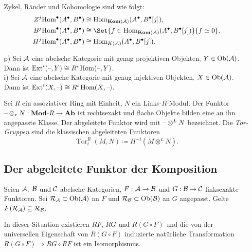 \documentclass{cheat-sheet}
\newcommand{\CCC}[1]{{#1}^{\bullet}} %
\DeclareMathOperator{\Tor}{Tor} %
\DeclareMathOperator{\Ext}{Ext} %
\newcommand{\Ada}{\mathcal{R}} %
\begin{document}
\begin{bem}
  Zykel, Ränder und Kohomologie sind wie folgt:
  \begin{align*}
    Z^j \CCC{\Hom}(\CCC{A}, \CCC{B}) & \cong \Hom_{\Kom(\Aat)}(\CCC{A}, \CCC{B}[j]), \\
    B^j \CCC{\Hom}(\CCC{A}, \CCC{B}) & \cong \Set{f \in \Hom_{\Kom(\Aat)}(\CCC{A}, \CCC{B}[j])}{f \simeq 0}, \\
    H^j \CCC{\Hom}(\CCC{A}, \CCC{B}) & \cong \Hom_{K(\Aat)}(\CCC{A}, \CCC{B}[j]).
  \end{align*}
\end{bem}

\begin{bem}
  p) \enspace Sei $\mathcal{A}$ eine abelsche Kategorie mit genug projektiven Objekten, $Y \in \operatorname{Ob}(\mathcal{A})$.
  Dann ist $\Ext^i(\blank, Y) \cong R^i \Hom(\blank, Y)$. \\
  i) \enspace Sei $\mathcal{A}$ eine abelsche Kategorie mit genug injektiven Objekten, $X \in \operatorname{Ob}(\mathcal{A})$.
  Dann ist $\Ext^i(X, \blank) \cong R^i \Hom(X, \blank)$.
\end{bem}

\begin{defn}
  Sei $R$ ein assoziativer Ring mit Einheit, $N$ ein Links-$R$-Modul.
  Der Funktor $\text{--} \otimes_r N : \text{$\mathbf{Mod}$-$R$} \to \mathbf{Ab}$ ist rechtsexakt und flache Objekte bilden eine an ihn angepasste Klasse.
  Der abgeleitete Funktor wird mit $\text{--} \otimes^L N$ bezeichnet.
  Die \emph{Tor-Gruppen} sind die klassischen abgeleiteten Funktoren
  \[ \Tor_i^R(M, N) \coloneqq H^{-i}(M \otimes^L N). \]
\end{defn}

\subsection{Der abgeleitete Funktor der Komposition}

\begin{situation}
  Seien $\mathcal{A}$, $\mathcal{B}$ und $\mathcal{C}$ abelsche Kategorien, $F : \mathcal{A} \to \mathcal{B}$ und $G : \mathcal{B} \to \mathcal{C}$ linksexakte Funktoren.
  Sei $\Ada_\Aat \subset \Ob(\Aat)$ an $F$ und $\Ada_\Bat \subset \Ob(\Bat)$ an $G$ angepasst.
  Gelte $F(\Ada_\Aat) \subseteq \Ada_\Bat$.
\end{situation}

\begin{thm}
  In dieser Situation existieren $RF$, $RG$ und $R(G \circ F)$ und die von der universellen Eigenschaft von $R(G \circ F)$ induzierte natürliche Transformation $R(G \circ F) \Rightarrow RG \circ RF$ ist ein Isomorphismus.
\end{thm}
\end{document}
